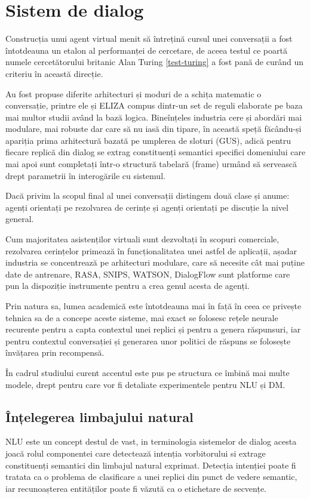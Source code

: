 \chapter{Sistem de dialog}


Construcția unui agent virtual menit să întrețină cursul unei conversații a fost întotdeauna un etalon al performanței de cercetare, de aceea testul ce poartă numele cercetătorului britanic Alan Turing \ref{test-turing} a fost pană de curând un criteriu în această direcție.

Au fost propuse diferite arhitecturi și moduri de a schița matematic o conversație, printre ele și ELIZA compus dintr-un set de reguli elaborate pe baza mai multor studii având la bază logica. Bineînțeles industria cere și abordări mai modulare, mai robuste dar care să nu iasă din tipare, în această speță făcându-și apariția prima arhitectură bazată pe umplerea de sloturi (GUS), adică pentru fiecare replică din dialog se extrag constituenți semantici specifici domeniului care mai apoi sunt completați într-o structură tabelară (frame) urmând să servească drept parametrii în interogările cu sistemul.

Dacă privim la scopul final al unei conversații distingem două clase și anume: agenți orientați pe rezolvarea de cerințe și agenți orientați pe discuție la nivel general.

Cum majoritatea asistenților virtuali sunt dezvoltați în scopuri comerciale, rezolvarea cerințelor primează în funcționalitatea unei astfel de aplicații, așadar industria se concentrează pe arhitecturi modulare, care să necesite cât mai puține date de antrenare, RASA, SNIPS, WATSON, DialogFlow sunt platforme care pun la dispoziție instrumente pentru a crea genul acesta de agenți.

Prin natura sa, lumea academică este întotdeauna mai în față în ceea ce privește tehnica sa de a concepe aceste sisteme, mai exact se folosesc rețele neurale recurente pentru a capta contextul unei replici și pentru a genera răspunsuri, iar pentru contextul conversației și generarea unor politici de răspuns se folosește învățarea prin recompensă. \cite{rl-seq2seq}

În cadrul studiului curent accentul este pus pe structura ce îmbină mai multe modele, drept pentru care vor fi detaliate experimentele pentru NLU și DM.

\section{Înțelegerea limbajului natural}
NLU este un concept destul de vast, in terminologia sistemelor de dialog acesta joacă rolul componentei care detectează intenția vorbitorului si extrage constituenți semantici din limbajul natural exprimat.
Detecția intenției poate fi tratata ca o problema de clasificare a unei replici din punct de vedere semantic, iar recunoașterea entităților poate fi văzută ca o etichetare de secvențe.
